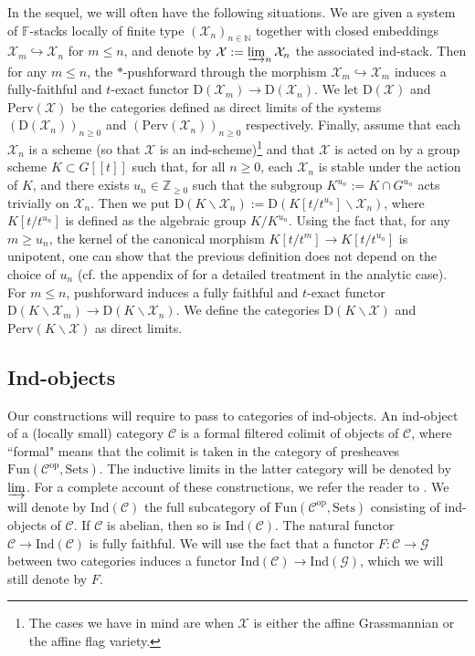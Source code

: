 \documentclass[11pt]{amsart}
\theoremstyle{plain}
\theoremstyle{remark}
\numberwithin{equation}{section}
\begin{document}
	In the sequel, we will often have the following situations. We are given a system of $\mathbb{F}$-stacks locally of finite type $(\mathcal{X}_n)_{n\in\mathbb{N}}$ together with closed embeddings $\mathcal{X}_m\hookrightarrow \mathcal{X}_n$ for $m\leq n$, and denote by $\mathcal{X}:=\varinjlim_{n}\mathcal{X}_n$ the associated ind-stack. Then for any $m\leq n$, the $*$-pushforward through the morphism $\mathcal{X}_m\hookrightarrow \mathcal{X}_m$ induces a fully-faithful and $t$-exact functor $\mathrm{D}(\mathcal{X}_m)\to \mathrm{D}(\mathcal{X}_n)$. We let $\mathrm{D}(\mathcal{X})$ and $\mathrm{Perv}(\mathcal{X})$ be the categories defined as direct limits of the systems $(\mathrm{D}(\mathcal{X}_n))_{n\geq 0}$ and $(\mathrm{Perv}(\mathcal{X}_n))_{n\geq 0}$ respectively.  Finally, assume that each $\mathcal{X}_n$ is a scheme (so that $\mathcal{X}$ is an ind-scheme)\footnote{The cases we have in mind are when $\mathcal{X}$ is either the affine Grassmannian or the affine flag variety.} and that $\mathcal{X}$ is acted on by a group scheme $K\subset G[[t]]$ such that, for all $n\geq 0$, each $\mathcal{X}_n$ is stable under the action of $K$, and there exists $u_n\in\mathbb{Z}_{\geq 0}$ such that the subgroup $K^{u_n}:=K\cap G^{u_n}$ acts trivially on $\mathcal{X}_n$. Then we put $\mathrm{D}(K\backslash \mathcal{X}_n):=\mathrm{D}(K[t/t^{u_n}]\backslash \mathcal{X}_n)$, where $K[t/t^{u_n}]$ is defined as the algebraic group $ K/K^{u_n}$. Using the fact that, for any $m\geq u_n$, the kernel of the canonical morphism $K[t/t^m]\to K[t/t^{u_n}]$ is unipotent, one can show that the previous definition does not depend on the choice of $u_n$ (cf. the appendix of \cite{baumann:hal-01491529} for a detailed treatment in the analytic case). For $m\leq n$, pushforward induces a fully faithful and $t$-exact functor $\mathrm{D}(K\backslash \mathcal{X}_m)\to \mathrm{D}(K\backslash \mathcal{X}_n)$. We define the categories $\mathrm{D}(K\backslash \mathcal{X})$ and $\mathrm{Perv}(K\backslash\mathcal{X})$ as direct limits.
	\subsection{Ind-objects} Our constructions will require to pass to categories of ind-objects. An ind-object of a (locally small) category $\mathcal{C}$ is a formal filtered colimit of objects of $\mathcal{C}$, where ``formal" means that the colimit is taken in the category of presheaves $\mathrm{Fun}(\mathcal{C}^\mathrm{op},\mathrm{Sets})$. The inductive limits in the latter category will be denoted by $\varinjlim $. For a complete account of these constructions, we refer the reader to \cite[Chapter 6]{Kash}. We will denote by $\mathrm{Ind}(\mathcal{C})$ the full subcategory of $\mathrm{Fun}(\mathcal{C}^\mathrm{op},\mathrm{Sets})$ consisting of ind-objects of $\mathcal{C}$. If $\mathcal{C}$ is abelian, then so is $\mathrm{Ind}(\mathcal{C})$. The natural functor $\mathcal{C}\to \mathrm{Ind}(\mathcal{C})$ is fully faithful. We will use the fact that a functor $F:\mathcal{C}\to \mathcal{G}$ between two categories induces a functor $\mathrm{Ind}(\mathcal{C})\to \mathrm{Ind}(\mathcal{G})$, which we will still denote by $F$. 
\end{document}
